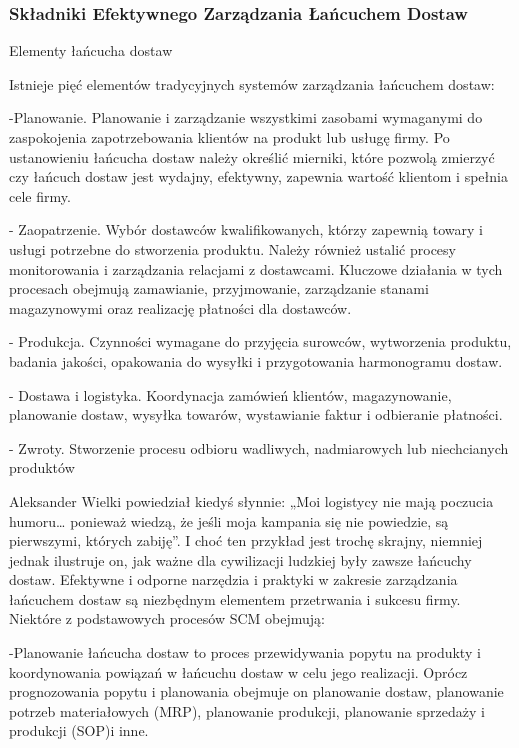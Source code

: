  

\vspace{\baselineskip}
\subsubsection{Składniki Efektywnego Zarządzania Łańcuchem Dostaw}



Elementy łańcucha dostaw

Istnieje pięć elementów tradycyjnych systemów zarządzania łańcuchem dostaw:

    -Planowanie. Planowanie i zarządzanie wszystkimi zasobami wymaganymi do zaspokojenia zapotrzebowania klientów na produkt lub usługę firmy. Po ustanowieniu łańcucha dostaw należy określić mierniki, które pozwolą zmierzyć czy łańcuch dostaw jest wydajny, efektywny, zapewnia wartość klientom i spełnia cele firmy.
    
   - Zaopatrzenie. Wybór dostawców kwalifikowanych, którzy zapewnią towary i usługi potrzebne do stworzenia produktu. Należy również ustalić procesy monitorowania i zarządzania relacjami z dostawcami. Kluczowe działania w tych procesach obejmują zamawianie, przyjmowanie, zarządzanie stanami magazynowymi oraz realizację płatności dla dostawców.
    
   - Produkcja. Czynności wymagane do przyjęcia surowców, wytworzenia produktu, badania jakości, opakowania do wysyłki i przygotowania harmonogramu dostaw.
    
   - Dostawa i logistyka. Koordynacja zamówień klientów, magazynowanie, planowanie dostaw, wysyłka towarów, wystawianie faktur i odbieranie płatności.
    
   - Zwroty. Stworzenie procesu odbioru wadliwych, nadmiarowych lub niechcianych produktów\cite{wdx2023}



Aleksander Wielki powiedział kiedyś słynnie: „Moi logistycy nie mają poczucia humoru… ponieważ wiedzą, że jeśli moja kampania się nie powiedzie, są pierwszymi, których zabiję”. I choć ten przykład jest trochę skrajny, niemniej jednak ilustruje on, jak ważne dla cywilizacji ludzkiej były zawsze łańcuchy dostaw. Efektywne i odporne narzędzia i praktyki w zakresie zarządzania łańcuchem dostaw są niezbędnym elementem przetrwania i sukcesu firmy. Niektóre z podstawowych procesów SCM obejmują:   

    -Planowanie łańcucha dostaw to proces przewidywania popytu na produkty i koordynowania powiązań w łańcuchu dostaw w celu jego realizacji. Oprócz prognozowania popytu i planowania obejmuje on planowanie dostaw, planowanie potrzeb materiałowych (MRP), planowanie produkcji, planowanie sprzedaży i produkcji (SOP)i inne. 

